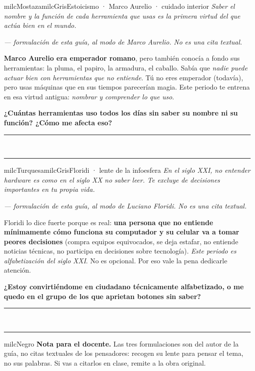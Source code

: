 \documentclass[11pt,letterpaper]{article}
\newcommand{\linead}[1]{\noindent\color{milcLinea}\rule{#1}{0.5pt}\color{milcNegro}}
\begin{document}
\begin{softbox}{milcMostaza}{milcGris}{Estoicismo · Marco Aurelio · cuidado interior}
\textit{Saber el nombre y la función de cada herramienta que usas es la primera virtud del que actúa bien en el mundo.}

{\footnotesize\itshape\color{milcNegro!70}--- formulación de esta guía, al modo de Marco Aurelio. No es una cita textual.}

\textbf{Marco Aurelio era emperador romano}, pero también conocía a fondo sus herramientas: la pluma, el papiro, la armadura, el caballo. Sabía que \emph{nadie puede actuar bien con herramientas que no entiende}. Tú no eres emperador (todavía), pero usas máquinas que en sus tiempos parecerían magia. Este periodo te entrena en esa virtud antigua: \emph{nombrar y comprender lo que uso}.

\textbf{¿Cuántas herramientas uso todos los días sin saber su nombre ni su función? ¿Cómo me afecta eso?}
\end{softbox}
\linead{\linewidth}\\[1mm]
\linead{\linewidth}

\begin{softbox}{milcTurquesa}{milcGris}{Floridi · lente de la infoesfera}
\textit{En el siglo XXI, no entender hardware es como en el siglo XX no saber leer. Te excluye de decisiones importantes en tu propia vida.}

{\footnotesize\itshape\color{milcNegro!70}--- formulación de esta guía, al modo de Luciano Floridi. No es una cita textual.}

Floridi lo dice fuerte porque es real: \textbf{una persona que no entiende mínimamente cómo funciona su computador y su celular va a tomar peores decisiones} (compra equipos equivocados, se deja estafar, no entiende noticias técnicas, no participa en decisiones sobre tecnología). \emph{Este periodo es alfabetización del siglo XXI}. No es opcional. Por eso vale la pena dedicarle atención.

\textbf{¿Estoy convirtiéndome en ciudadano técnicamente alfabetizado, o me quedo en el grupo de los que aprietan botones sin saber?}
\end{softbox}
\linead{\linewidth}\\[1mm]
\linead{\linewidth}

\begin{infoband}{milcNegro}
\textbf{Nota para el docente.} Las tres formulaciones son del autor de la guía, no citas textuales de los pensadores: recogen su lente para pensar el tema, no sus palabras. Si vas a citarlos en clase, remite a la obra original.
\end{infoband}
\end{document}
